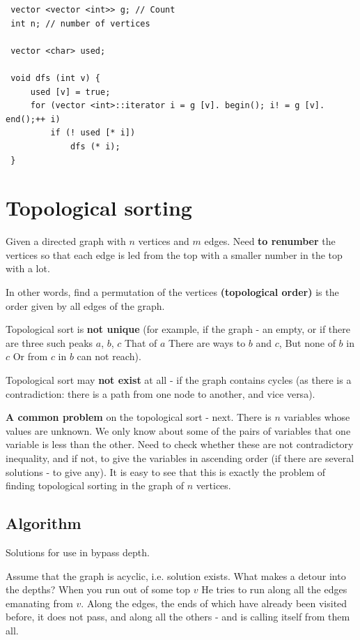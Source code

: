 \begin{verbatim}
 vector <vector <int>> g; // Count
 int n; // number of vertices

 vector <char> used;

 void dfs (int v) {
     used [v] = true;
     for (vector <int>::iterator i = g [v]. begin(); i! = g [v]. end();++ i)
         if (! used [* i])
             dfs (* i);
 } 
\end{verbatim}
\section{ Topological sorting }
Given a directed graph with $n$ vertices and $m$ edges. Need \textbf{to renumber} the vertices so that each edge is led from the top with a smaller number in the top with a lot.

In other words, find a permutation of the vertices \textbf{(topological order)} is the order given by all edges of the graph.

Topological sort is \textbf{not unique} (for example, if the graph - an empty, or if there are three such peaks $a$, $b$, $c$ That of $a$ There are ways to $b$ and $c$, But none of $b$ in $c$ Or from $c$ in $b$ can not reach).

Topological sort may \textbf{not exist} at all - if the graph contains cycles (as there is a contradiction: there is a path from one node to another, and vice versa).

\textbf{A common problem} on the topological sort - next. There is $n$ variables whose values ​​are unknown. We only know about some of the pairs of variables that one variable is less than the other. Need to check whether these are not contradictory inequality, and if not, to give the variables in ascending order (if there are several solutions - to give any). It is easy to see that this is exactly the problem of finding topological sorting in the graph of $n$ vertices.

\subsection{ Algorithm }

Solutions for use in bypass depth.

Assume that the graph is acyclic, i.e. solution exists. What makes a detour into the depths? When you run out of some top $v$ He tries to run along all the edges emanating from $v$. Along the edges, the ends of which have already been visited before, it does not pass, and along all the others - and is calling itself from them all.

